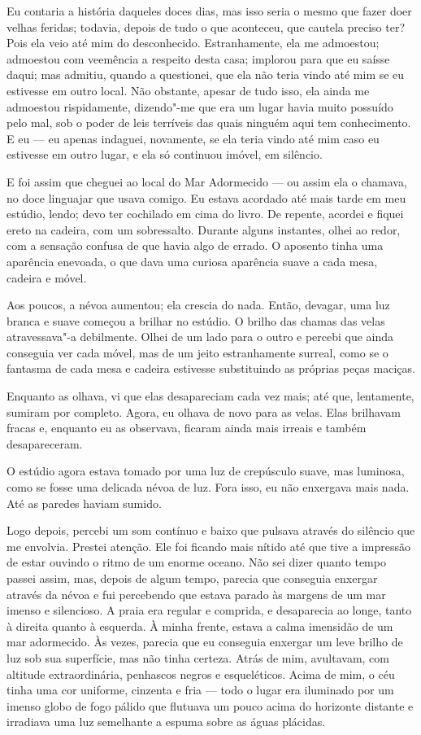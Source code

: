 Eu contaria a história daqueles doces dias, mas isso seria o mesmo que fazer doer velhas feridas; todavia, depois de
tudo o que aconteceu, que cautela preciso ter? Pois ela veio até mim do desconhecido. Estranhamente, ela me admoestou;
admoestou com veemência a respeito desta casa; implorou para que eu saísse daqui; mas admitiu, quando a questionei, que
ela não teria vindo até mim se eu estivesse em outro local. Não obstante, apesar de tudo isso, ela ainda me admoestou
rispidamente, dizendo"-me que era um lugar havia muito possuído pelo mal, sob o poder de leis terríveis das quais ninguém
aqui tem conhecimento. E eu --- eu apenas indaguei, novamente, se ela teria vindo até mim caso eu estivesse em outro
lugar, e ela só continuou imóvel, em silêncio.

E foi assim que cheguei ao local do Mar Adormecido --- ou assim ela o chamava, no doce linguajar que usava comigo. Eu
estava acordado até mais tarde em meu estúdio, lendo; devo ter cochilado em cima do livro. De repente, acordei e fiquei
ereto na cadeira, com um sobressalto. Durante alguns instantes, olhei ao redor, com a sensação confusa de que havia
algo de errado. O aposento tinha uma aparência enevoada, o que dava uma curiosa aparência suave a cada mesa, cadeira e
móvel.

Aos poucos, a névoa aumentou; ela crescia do nada. Então, devagar, uma luz branca e suave começou a brilhar no
estúdio. O brilho das chamas das velas atravessava"-a debilmente. Olhei de um lado para o outro e percebi que ainda
conseguia ver cada móvel, mas de um jeito estranhamente surreal, como se o fantasma de cada mesa e cadeira estivesse
substituindo as próprias peças maciças.

Enquanto as olhava, vi que elas desapareciam cada vez mais; até que, lentamente, sumiram por completo. Agora,
eu olhava de novo para as velas. Elas brilhavam fracas e, enquanto eu as observava, ficaram ainda mais irreais e
também desapareceram.

O estúdio agora estava tomado por uma luz de crepúsculo suave, mas luminosa, como se fosse uma delicada névoa de luz.
Fora isso, eu não enxergava mais nada. Até as paredes haviam sumido. 

Logo depois, percebi um som contínuo e baixo que pulsava através do silêncio que me envolvia. Prestei atenção. Ele foi
ficando mais nítido até que tive a impressão de estar ouvindo o ritmo de um enorme oceano. Não sei dizer quanto tempo
passei assim, mas, depois de algum tempo, parecia que conseguia enxergar através da névoa e fui percebendo que
estava parado às margens de um mar imenso e silencioso. A praia era regular e comprida, e desaparecia ao longe, tanto à
direita quanto à esquerda. À minha frente, estava a calma imensidão de um mar adormecido. Às vezes, parecia que eu
conseguia enxergar um leve brilho de luz sob sua superfície, mas não tinha certeza. Atrás de mim, avultavam, com
altitude extraordinária, penhascos negros e esqueléticos. Acima de mim, o céu tinha uma cor uniforme, cinzenta e fria ---
todo o lugar era iluminado por um imenso globo de fogo pálido que flutuava um pouco acima do horizonte distante e
irradiava uma luz semelhante a espuma sobre as águas plácidas.

